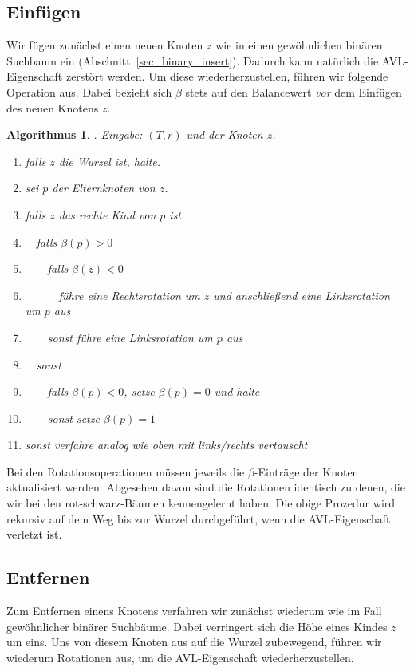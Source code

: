 \documentclass[10pt,reqno]{amsart}
\numberwithin{equation}{section}
\newtheorem{algorithm}[definition]{Algorithmus}
\begin{document}
\subsection{Einf\"ugen}\label{sec_avl_insert}
Wir f\"ugen zun\"achst einen neuen Knoten $z$ wie in einen gew\"ohnlichen bin\"aren Suchbaum ein (Abschnitt~\ref{sec_binary_insert}).
Dadurch kann nat\"urlich die AVL-Eigenschaft zerst\"ort werden.
Um diese wiederherzustellen, f\"uhren wir folgende Operation aus.
Dabei bezieht sich $\beta$ stets auf den Balancewert {\em vor} dem Einf\"ugen des neuen Knotens $z$.

\begin{algorithm}. {\em Eingabe:} $(T,r)$ und der Knoten $z$.
	\begin{enumerate}
		\item falls $z$ die Wurzel ist, halte.
		\item sei $p$ der Elternknoten von $z$.
		\item falls $z$ das rechte Kind von $p$ ist
		\item $\quad$falls $\beta(p)>0$
		\item $\qquad$falls $\beta(z)<0$
		\item $\quad\qquad$f\"uhre eine Rechtsrotation um $z$ und anschlie\ss end eine Linksrotation um $p$ aus
		\item $\qquad$sonst f\"uhre eine Linksrotation um $p$ aus
		\item $\quad$sonst
		\item $\qquad$falls $\beta(p)<0$, setze $\beta(p)=0$ und halte
		\item $\qquad$sonst setze $\beta(p)=1$ %
		\item sonst verfahre analog wie oben mit links/rechts vertauscht
	\end{enumerate}
\end{algorithm}

Bei den Rotationsoperationen m\"ussen jeweils die $\beta$-Eintr\"age der Knoten aktualisiert werden.
Abgesehen davon sind die Rotationen identisch zu denen, die wir bei den rot-schwarz-B\"aumen kennengelernt haben.
Die obige Prozedur wird rekursiv auf dem Weg bis zur Wurzel durchgef\"uhrt, wenn die AVL-Eigenschaft verletzt ist.

\subsection{Entfernen}\label{sec_avl_delete}
Zum Entfernen einens Knotens verfahren wir zun\"achst wiederum wie im Fall gew\"ohnlicher bin\"arer Suchb\"aume.
Dabei verringert sich die H\"ohe eines Kindes $z$ um eins.
Uns von diesem Knoten aus auf die Wurzel zubewegend, f\"uhren wir wiederum Rotationen aus, um die AVL-Eigenschaft wiederherzustellen.
\end{document}
